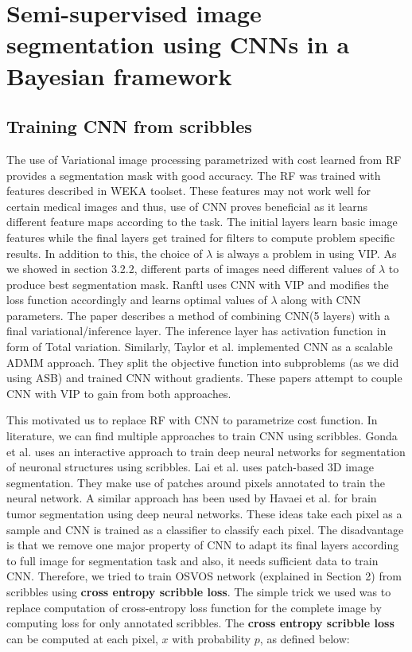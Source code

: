 \chapter{Semi-supervised image segmentation using CNNs in a Bayesian framework}
\section{Training CNN from scribbles}
The use of Variational image processing parametrized with cost learned from RF provides a segmentation mask with good accuracy. The RF was trained with features described in WEKA toolset. These features may not work well for certain medical images and thus, use of CNN proves beneficial as it learns different feature maps according to the task. The initial layers learn basic image features while the final layers get trained for filters to compute problem specific results. In addition to this, the choice of $\lambda$ is always a problem in using VIP. As we showed in section 3.2.2, different parts of images need different values of $\lambda$ to produce best segmentation mask. Ranftl \cite{ranftl:2014} uses CNN with VIP and modifies the loss function accordingly and learns optimal values of $\lambda$ along with CNN parameters. The paper describes a method of combining CNN(5 layers) with a final variational/inference layer. The inference layer has activation function in form of Total variation. Similarly, Taylor et al. \cite{taylor:2016} implemented CNN as a scalable ADMM approach. They split the objective function into subproblems (as we did using ASB) and trained CNN without gradients. These papers attempt to couple CNN with VIP to gain from both approaches. \par

This motivated us to replace RF with CNN to parametrize cost function. In literature, we can find multiple approaches to train CNN using scribbles. Gonda et al.\cite{Gonda:2016} uses an interactive approach to train deep neural networks for segmentation of neuronal structures using scribbles. Lai et al. \cite{Lai:2015} uses patch-based 3D image segmentation. They make use of patches around pixels annotated to train the neural network. A similar approach has been used by Havaei et al.\cite{Havaei:2015} for brain tumor segmentation using deep neural networks. These ideas take each pixel as a sample and CNN is trained as a classifier to classify each pixel. The disadvantage is that we remove one major property of CNN to adapt its final layers according to full image for segmentation task and also, it needs sufficient data to train CNN. Therefore, we tried to train OSVOS network (explained in Section 2) from scribbles using \textbf{cross entropy scribble loss}. The simple trick we used was to replace computation of cross-entropy loss function for the complete image by computing loss for only annotated scribbles. The \textbf{cross entropy scribble loss} can be computed at each pixel, $x$ with probability $p$, as defined below:


